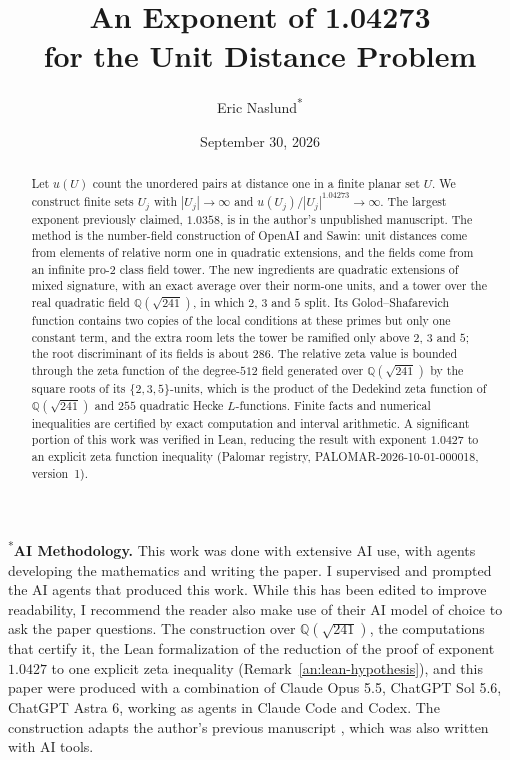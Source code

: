 \documentclass[11pt]{amsart}
\title[The Unit Distance Problem]{An Exponent of 1.04273\\for the Unit Distance Problem}
\author[Eric Naslund]{Eric Naslund\textsuperscript{*}}
\date{September 30, 2026}
\numberwithin{equation}{section}
\theoremstyle{definition}
\theoremstyle{remark}
\newcommand{\Q}{\mathbb Q}
\begin{document}
\begin{abstract}
Let $u(U)$ count the unordered pairs at distance one in a finite planar
set $U$. We construct finite sets $U_j$ with $|U_j|\to\infty$ and
$u(U_j)/|U_j|^{1.04273}\to\infty$. The largest exponent previously
claimed, $1.0358$, is in the author's unpublished manuscript. The
method is the number-field construction of OpenAI and Sawin: unit
distances come from elements of relative norm one in quadratic
extensions, and the fields come from an infinite pro-$2$ class field
tower. The new ingredients are quadratic extensions of mixed signature,
with an exact average over their norm-one units, and a tower over the
real quadratic field $\Q(\sqrt{241})$, in which $2$, $3$ and $5$ split.
Its Golod--Shafarevich function contains two copies of the local
conditions at these primes but only one constant term, and the extra room
lets the tower be ramified only above $2$, $3$ and $5$; the root
discriminant of its fields is about $286$. The relative zeta value is bounded through the zeta function of the
degree-$512$ field generated over $\Q(\sqrt{241})$ by the square roots of
its $\{2,3,5\}$-units, which is the product of the Dedekind zeta function
of $\Q(\sqrt{241})$ and $255$ quadratic Hecke $L$-functions. Finite facts and numerical
inequalities are certified by exact computation and interval arithmetic. A significant portion of this work was verified in Lean, reducing the result with exponent $1.0427$ to an explicit zeta function inequality (Palomar registry, PALOMAR-2026-10-01-000018, version~1).
\end{abstract}
\maketitle

{\noindent\small\textsuperscript{*}\textbf{AI Methodology.} This work was done with extensive AI use, with agents developing the mathematics and writing the paper. I supervised and prompted the AI agents that produced this work. While this has been edited to improve readability, I recommend the reader also make use of their AI model of choice to ask the paper questions. The
construction over $\Q(\sqrt{241})$, the computations that certify it, the
Lean formalization of the reduction of the proof of exponent $1.0427$ to one
explicit zeta inequality (Remark~\ref{an:lean-hypothesis}), and this paper
were produced with a combination of Claude Opus 5.5, ChatGPT Sol 5.6, ChatGPT Astra 6, working as agents in Claude Code and Codex. The construction adapts the author's previous manuscript
\cite{Naslund0358}, which was also written with AI tools.\par}
\medskip
\end{document}
